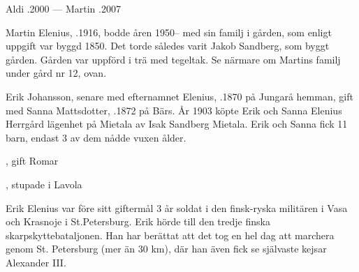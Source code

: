 Aldi .2000  ---  Martin .2007





Martin Elenius, .1916,  bodde åren 1950-- med sin familj i gården, som enligt uppgift var byggd 1850. Det torde således varit Jakob Sandberg, som byggt gården. Gården var uppförd i trä med tegeltak. Se närmare om Martins familj under gård nr 12, ovan.

Erik Johansson, senare med efternamnet Elenius,  .1870 på Jungarå hemman, gift med Sanna Mattsdotter,  .1872 på Bärs. År 1903 köpte Erik och Sanna Elenius Herrgård lägenhet på Mietala av Isak Sandberg Mietala. Erik och Sanna fick 11 barn, endast 3 av dem nådde vuxen ålder.
\begin{jhchildren}
  \item {}
  \item {}
  \item {}
  \item {}
  \item {}, gift Romar
  \item {}
  \item {}
  \item {}
  \item {}
  \item {}
  \item {}, stupade i Lavola
\end{jhchildren}
Erik Elenius var före sitt giftermål 3 år soldat i den finsk-ryska militären i Vasa och Krasnoje i St.Petersburg. Erik hörde till den tredje finska skarpskyttebataljonen. Han har berättat att det tog en hel dag att marchera genom St. Petersburg (mer än 30 km), där han även fick se självaste kejsar Alexander III.

